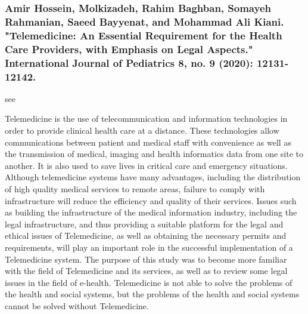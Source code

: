 \documentclass[conference]{IEEEtran}
\begin{document}
\medskip
\subsubsection{Amir Hossein, Molkizadeh, Rahim Baghban, Somayeh Rahmanian, Saeed Bayyenat, and Mohammad Ali Kiani. "Telemedicine: An Essential Requirement for the Health Care Providers, with Emphasis on Legal Aspects." International Journal of Pediatrics 8, no. 9 (2020): 12131-12142.}
see \cite{amir2020telemedicine}

Telemedicine is the use of telecommunication and information technologies in order to provide clinical health care at a distance. These technologies allow communications between patient and medical staff with convenience as well as the transmission of medical, imaging and health informatics data from one site to another. It is also used to save lives in critical care and emergency situations. Although telemedicine systems have many advantages, including the distribution of high quality medical services to remote areas, failure to comply with infrastructure will reduce the efficiency and quality of their services. Issues such as building the infrastructure of the medical information industry, including the legal infrastructure, and thus providing a suitable platform for the legal and ethical issues of Telemedicine, as well as obtaining the necessary permits and requirements, will play an important role in the successful implementation of a Telemedicine system. The purpose of this study was to become more familiar with the field of Telemedicine and its services, as well as to review some legal issues in the field of e-health. Telemedicine is not able to solve the problems of the health and social systems, but the problems of the health and social systems cannot be solved without Telemedicine.








\end{document}
